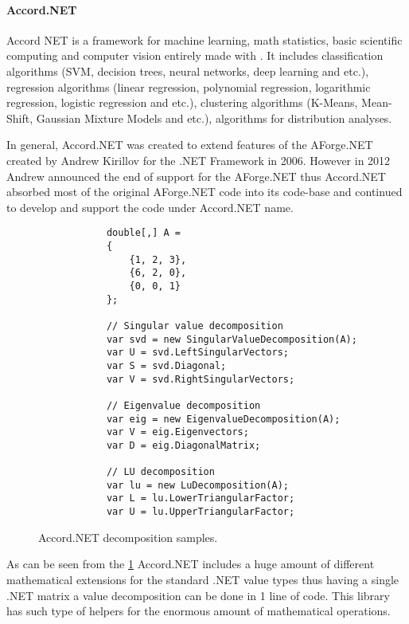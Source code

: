 \documentclass[../../../../main]{subfiles}
\begin{document}
\paragraph{Accord.NET}

Accord NET is a framework for machine learning, math statistics, basic scientific computing and computer vision entirely made with {\Csharp}. It includes classification algorithms (\ac{SVM}, decision trees, neural networks, deep learning and etc.), regression algorithms (linear regression, polynomial regression, logarithmic regression, logistic regression and etc.), clustering algorithms (K-Means, Mean-Shift, Gaussian Mixture Models and etc.), algorithms for distribution analyses.

In general, Accord.NET was created to extend features of the AForge.NET created by Andrew Kirillov for the .NET Framework in 2006. However in 2012 Andrew announced the end of support for the AForge.NET thus Accord.NET absorbed most of the original AForge.NET code into its code-base and continued to develop and support the code under Accord.NET name.

\begin{figure} [!ht]
  \centering    
    \lstset{style=sharpc}
        \begin{lstlisting}
            double[,] A = 
            {
                {1, 2, 3},
                {6, 2, 0},
                {0, 0, 1}
            };

            // Singular value decomposition
            var svd = new SingularValueDecomposition(A);
            var U = svd.LeftSingularVectors;
            var S = svd.Diagonal;
            var V = svd.RightSingularVectors;

            // Eigenvalue decomposition
            var eig = new EigenvalueDecomposition(A);
            var V = eig.Eigenvectors;
            var D = eig.DiagonalMatrix;

            // LU decomposition
            var lu = new LuDecomposition(A);
            var L = lu.LowerTriangularFactor;
            var U = lu.UpperTriangularFactor;         
        \end{lstlisting}
  \caption{Accord.NET decomposition samples.}
  \label{accordnetdecompose}
\end{figure}

As can be seen from the \ref{accordnetdecompose} Accord.NET includes a huge amount of different mathematical extensions for the standard .NET value types thus having a single .NET matrix a value decomposition can be done in 1 line of code. This library has such type of helpers for the enormous amount of mathematical operations.
\end{document}
